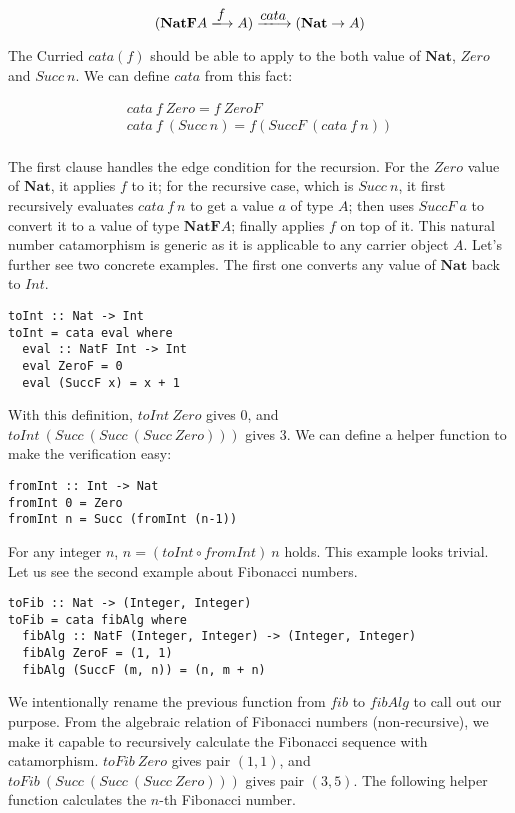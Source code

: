 \documentclass{article}
\begin{document}
\[
(\mathbf{NatF} A \arrowto{f} A) \arrowto{cata} (\mathbf{Nat} \to A)
\]

The Curried $cata(f)$ should be able to apply to the both value of $\mathbf{Nat}$, $Zero$ and $Succ\ n$. We can define $cata$ from this fact:

\[
\begin{array}{l}
cata\ f\ Zero = f\ ZeroF \\
cata\ f\ (Succ\ n) = f (SuccF\ (cata\ f\ n)) \\
\end{array}
\]

The first clause handles the edge condition for the recursion. For the $Zero$ value of $\mathbf{Nat}$, it applies $f$ to it; for the recursive case, which is $Succ\ n$, it first recursively evaluates $cata\ f\ n$ to get a value $a$ of type $A$; then uses $SuccF\ a$ to convert it to a value of type $\mathbf{NatF}A$; finally applies $f$ on top of it. This natural number catamorphism is generic as it is applicable to any carrier object $A$. Let's further see two concrete examples. The first one converts any value of $\mathbf{Nat}$ back to $Int$.

\lstset{frame=single}
\begin{lstlisting}[style=Haskell]
toInt :: Nat -> Int
toInt = cata eval where
  eval :: NatF Int -> Int
  eval ZeroF = 0
  eval (SuccF x) = x + 1
\end{lstlisting}

With this definition, $toInt\ Zero$ gives 0, and $toInt\ (Succ\ (Succ\ (Succ\ Zero)))$ gives 3. We can define a helper function to make the verification easy:

\begin{lstlisting}[style=Haskell]
fromInt :: Int -> Nat
fromInt 0 = Zero
fromInt n = Succ (fromInt (n-1))
\end{lstlisting}

For any integer $n$, $n = (toInt \circ fromInt)\ n$ holds. This example looks trivial. Let us see the second example about Fibonacci numbers.

\begin{lstlisting}[style=Haskell]
toFib :: Nat -> (Integer, Integer)
toFib = cata fibAlg where
  fibAlg :: NatF (Integer, Integer) -> (Integer, Integer)
  fibAlg ZeroF = (1, 1)
  fibAlg (SuccF (m, n)) = (n, m + n)
\end{lstlisting}

We intentionally rename the previous function from $fib$ to $fibAlg$ to call out our purpose. From the algebraic relation of Fibonacci numbers (non-recursive), we make it capable to recursively calculate the Fibonacci sequence with catamorphism. $toFib\ Zero$ gives pair $(1, 1)$, and $toFib\ (Succ\ (Succ\ (Succ\ Zero)))$ gives pair $(3, 5)$. The following helper function calculates the $n$-th Fibonacci number.
\end{document}

